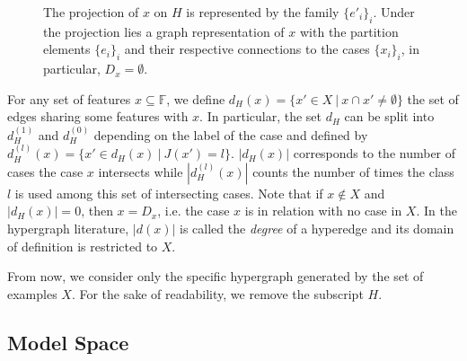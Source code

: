 \documentclass[sigconf,edbt]{acmart-edbt-workshops}
\begin{document}
\begin{figure}[b]
  \caption{\label{new_case_schema} The projection of $x$ on $H$ is represented by the family  $\{ e'_i\}_i$. Under the projection lies a graph representation of $x$ with the partition elements $\{ e_i\}_i$ and their respective connections to the cases $\{x_i\}_i$, in particular, $D_x = \emptyset$.}
\end{figure}

For any set of features $x \subseteq \mathbb F$, we define $d_H(x) = \{ x' \in X ~ | ~ x \cap x' \neq \emptyset \}$ the set of edges sharing some features with $x$. In particular, the set $d_H$ can be split into $d_H^{(1)}$ and $d_H^{(0)}$ depending on the label of the case and defined by $d_H^{(l)}(x) = \{x' \in d_H(x) ~ | ~ J(x') = l \}$. $|d_H(x)|$ corresponds to the number of cases the case $x$ intersects while $|d_H^{(l)}(x)|$ counts the number of times the class $l$ is used among this set of intersecting cases. Note that if $x \not \in X$ and $|d_H(x)| = 0$, then $x = D_x$, i.e. the case $x$ is in relation with no case in $X$. In the hypergraph literature, $|d(x)|$ is called the {\it degree} of a hyperedge and its domain of definition is restricted to $X$.

From now, we consider only the specific hypergraph generated by the set of examples $X$. For the sake of readability, we remove the subscript $H$.

\subsection{Model Space}
\end{document}
